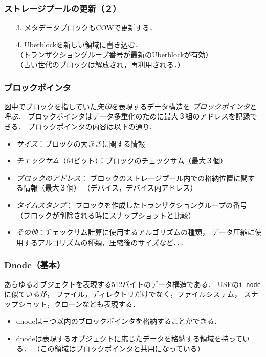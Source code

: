 \documentclass[handout]{beamer}                   %
\begin{document}
\begin{frame}[fragile]
  \frametitle{ストレージプールの更新（２）}
  \vfill
  \begin{enumerate}
    \item[3.] メタデータブロックもCOWで更新する．
    \item[4.] Uberblockを新しい領域に書き込む．\\
      （トランザクショングループ番号が最新のUberblockが有効）\\
      （古い世代のブロックは解放され，再利用される．）
  \end{enumerate}
  \vfill
\end{frame}

\begin{frame}[fragile]
  \frametitle{ブロックポインタ}
  図中でブロックを指していた\emph{矢印}を表現するデータ構造を
  \emph{ブロックポインタ}と呼ぶ．
  ブロックポインタはデータ多重化のために最大３組のアドレスを記録できる．
  ブロックポインタの内容は以下の通り．
  \vfill
  \begin{itemize}
  \item \emph{サイズ}：ブロックの大きさに関する情報
  \item \emph{チェックサム}（64ビット）：ブロックのチェックサム（最大３個）
  \item \emph{ブロックのアドレス}：
    ブロックのストレージプール内での格納位置に関する情報（最大３個）
    （デバイス，デバイス内アドレス）
  \item \emph{タイムスタンプ}：
    ブロックを作成したトランザクショングループの番号
    （ブロックが削除される時にスナップショットと比較）
  \item \emph{その他}：チェックサム計算に使用するアルゴリズムの種類，
    データ圧縮に使用するアルゴリズムの種類，圧縮後のサイズなど．．．
  \end{itemize}
  \vfill
\end{frame}

\begin{frame}[fragile]
  \frametitle{Dnode（基本）}
  あらゆるオブジェクトを表現する512バイトのデータ構造である．
  USFの\texttt{i-node}に似ているが，
  ファイル，ディレクトリだけでなく，ファイルシステム，
  スナップショット，クローンなども表現する．
  \vfill
  \centerline{}
  \vfill
  \begin{itemize}
  \item dnodeは三つ以内のブロックポインタを格納することができる．
  \item dnodeは表現するオブジェクトに応じたデータを格納する領域を持っている．
    （この領域はブロックポインタと共用になっている）
  \end{itemize}
  \vfill
\end{frame}
\end{document}
